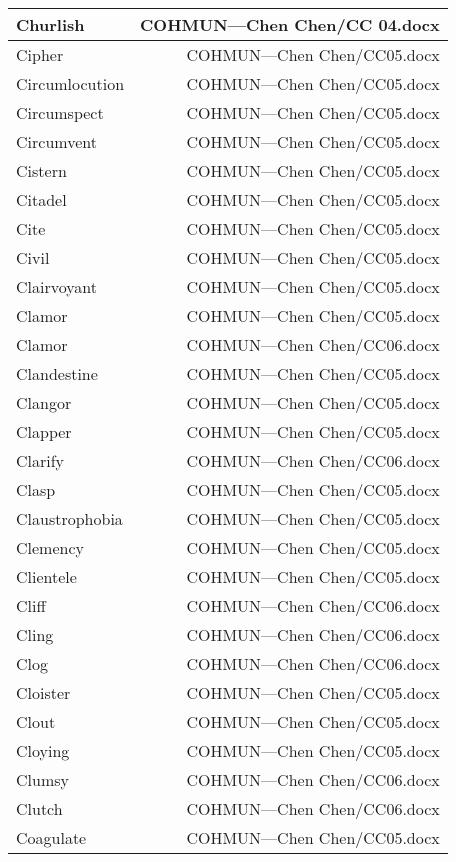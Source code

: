 \documentclass{article}
\begin{document}
\begin{center}
\begin{longtable}{|l|r|}
\hline
Churlish  &  COHMUN---Chen Chen/CC 04.docx\\  
\hline
Cipher  &  COHMUN---Chen Chen/CC05.docx\\  
\hline
Circumlocution  &  COHMUN---Chen Chen/CC05.docx\\  
\hline
Circumspect  &  COHMUN---Chen Chen/CC05.docx\\  
\hline
Circumvent  &  COHMUN---Chen Chen/CC05.docx\\  
\hline
Cistern  &  COHMUN---Chen Chen/CC05.docx\\  
\hline
Citadel  &  COHMUN---Chen Chen/CC05.docx\\  
\hline
Cite  &  COHMUN---Chen Chen/CC05.docx\\  
\hline
Civil  &  COHMUN---Chen Chen/CC05.docx\\  
\hline
Clairvoyant  &  COHMUN---Chen Chen/CC05.docx\\  
\hline
Clamor  &  COHMUN---Chen Chen/CC05.docx\\  
\hline
Clamor  &  COHMUN---Chen Chen/CC06.docx\\  
\hline
Clandestine  &  COHMUN---Chen Chen/CC05.docx\\  
\hline
Clangor  &  COHMUN---Chen Chen/CC05.docx\\  
\hline
Clapper  &  COHMUN---Chen Chen/CC05.docx\\  
\hline
Clarify  &  COHMUN---Chen Chen/CC06.docx\\  
\hline
Clasp  &  COHMUN---Chen Chen/CC05.docx\\  
\hline
Claustrophobia  &  COHMUN---Chen Chen/CC05.docx\\  
\hline
Clemency  &  COHMUN---Chen Chen/CC05.docx\\  
\hline
Clientele  &  COHMUN---Chen Chen/CC05.docx\\  
\hline
Cliff  &  COHMUN---Chen Chen/CC06.docx\\  
\hline
Cling  &  COHMUN---Chen Chen/CC06.docx\\  
\hline
Clog  &  COHMUN---Chen Chen/CC06.docx\\  
\hline
Cloister  &  COHMUN---Chen Chen/CC05.docx\\  
\hline
Clout  &  COHMUN---Chen Chen/CC05.docx\\  
\hline
Cloying  &  COHMUN---Chen Chen/CC05.docx\\  
\hline
Clumsy  &  COHMUN---Chen Chen/CC06.docx\\  
\hline
Clutch  &  COHMUN---Chen Chen/CC06.docx\\  
\hline
Coagulate  &  COHMUN---Chen Chen/CC05.docx\\  

\end{longtable}
\end{center}
\end{document}
